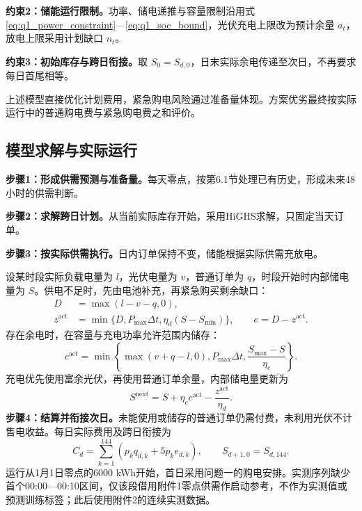 \noindent\textbf{约束2：储能运行限制。}功率、储电递推与容量限制沿用式\eqref{eq:q1_power_constraint}—\eqref{eq:q1_soc_bound}，光伏充电上限改为预计余量 $a_t$，放电上限采用计划缺口 $n_t$。

\noindent\textbf{约束3：初始库存与跨日衔接。}取 $S_0=S_{d,0}$，日末实际余电传递至次日，不再要求每日首尾相等。

上述模型直接优化计划费用，紧急购电风险通过准备量体现。方案优劣最终按实际运行中的普通购电费与紧急购电费之和评价。

\subsection{模型求解与实际运行}
\noindent\textbf{步骤1：形成供需预测与准备量。}每天零点，按第6.1节处理已有历史，形成未来48小时的供需判断。

\noindent\textbf{步骤2：求解跨日计划。}从当前实际库存开始，采用HiGHS求解，只固定当天订单。

\noindent\textbf{步骤3：按实际供需执行。}日内订单保持不变，储能根据实际供需充放电。

设某时段实际负载电量为 $l$，光伏电量为 $v$，普通订单为 $q$，时段开始时内部储电量为 $S$。供电不足时，先由电池补充，再紧急购买剩余缺口：
\begin{align}
D&=\max(l-v-q,0),\label{eq:q2_actual_deficit}\\
z^{\mathrm{act}}&=\min\{D,P_{\max}\Delta t,\eta_d(S-S_{\min})\},\qquad e=D-z^{\mathrm{act}}.\label{eq:q2_emergency}
\end{align}
存在余电时，在容量与充电功率允许范围内储存：
\begin{equation}
c^{\mathrm{act}}=\min\left\{\max(v+q-l,0),P_{\max}\Delta t,\frac{S_{\max}-S}{\eta_c}\right\}.
\label{eq:q2_actual_charge}
\end{equation}
充电优先使用富余光伏，再使用普通订单余量，内部储电量更新为
\begin{equation}
S^{\mathrm{next}}=S+\eta_cc^{\mathrm{act}}-\frac{z^{\mathrm{act}}}{\eta_d}.
\label{eq:q2_actual_soc}
\end{equation}
\noindent\textbf{步骤4：结算并衔接次日。}未能使用或储存的普通订单仍需付费，未利用光伏不计售电收益。每日实际费用及跨日衔接为
\begin{equation}
C_d=\sum_{k=1}^{144}\left(p_kq_{d,k}+5p_ke_{d,k}\right),\qquad S_{d+1,0}=S_{d,144}.
\label{eq:q2_daily_cost}
\end{equation}
运行从1月1日零点的6000 kWh开始，首日采用问题一的购电安排。实测序列缺少首个00:00—00:10区间，仅该段借用附件1零点供需作启动参考，不作为实测值或预测训练标签；此后使用附件2的连续实测数据。

